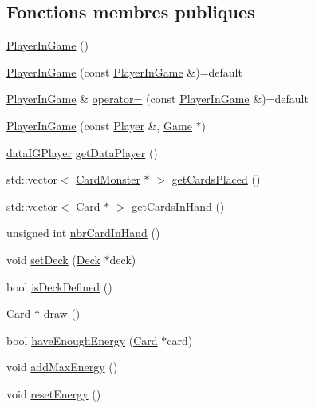 \subsection*{Fonctions membres publiques}
\begin{DoxyCompactItemize}
\item 
\hyperlink{classPlayerInGame_aef3887730c6e58e3ffa4b8636f5a1fd4}{Player\+In\+Game} ()
\item 
\hyperlink{classPlayerInGame_a0015afc910afa4cc1cf4b28c689d78bc}{Player\+In\+Game} (const \hyperlink{classPlayerInGame}{Player\+In\+Game} \&)=default
\item 
\hyperlink{classPlayerInGame}{Player\+In\+Game} \& \hyperlink{classPlayerInGame_a9ce4261937a8d6e1587896166884c4ac}{operator=} (const \hyperlink{classPlayerInGame}{Player\+In\+Game} \&)=default
\item 
\hyperlink{classPlayerInGame_a5a34ac5ac93a64bb1208893d9bc0564d}{Player\+In\+Game} (const \hyperlink{classPlayer}{Player} \&, \hyperlink{classGame}{Game} $\ast$)
\item 
\hyperlink{structdataIGPlayer}{data\+I\+G\+Player} \hyperlink{classPlayerInGame_addeeee2e42cf2009fc21511624414146}{get\+Data\+Player} ()
\item 
std\+::vector$<$ \hyperlink{classCardMonster}{Card\+Monster} $\ast$ $>$ \hyperlink{classPlayerInGame_a519fc525decf5af1217b93749cd9ae99}{get\+Cards\+Placed} ()
\item 
std\+::vector$<$ \hyperlink{classCard}{Card} $\ast$ $>$ \hyperlink{classPlayerInGame_a9bed48a016fa37c67d4aa9e85e3daa9d}{get\+Cards\+In\+Hand} ()
\item 
unsigned int \hyperlink{classPlayerInGame_a9f8df0a2ef00955f318b41149f57fcb7}{nbr\+Card\+In\+Hand} ()
\item 
void \hyperlink{classPlayerInGame_a399370210526407c4234d19815a5fa44}{set\+Deck} (\hyperlink{classDeck}{Deck} $\ast$deck)
\item 
bool \hyperlink{classPlayerInGame_af4d06834c260aebb66c113f397ba3c86}{is\+Deck\+Defined} ()
\item 
\hyperlink{classCard}{Card} $\ast$ \hyperlink{classPlayerInGame_aef5bd608ed523be4eef3eda1c63a3f0a}{draw} ()
\item 
bool \hyperlink{classPlayerInGame_ac1629d9cadf7445be42eb3245daef6c4}{have\+Enough\+Energy} (\hyperlink{classCard}{Card} $\ast$card)
\item 
void \hyperlink{classPlayerInGame_aedc8c0d75e0d249fde42329dc0a59557}{add\+Max\+Energy} ()
\item 
void \hyperlink{classPlayerInGame_ad18e833fa982d9db29521b49c74b1fa0}{reset\+Energy} ()

\end{DoxyCompactItemize}
